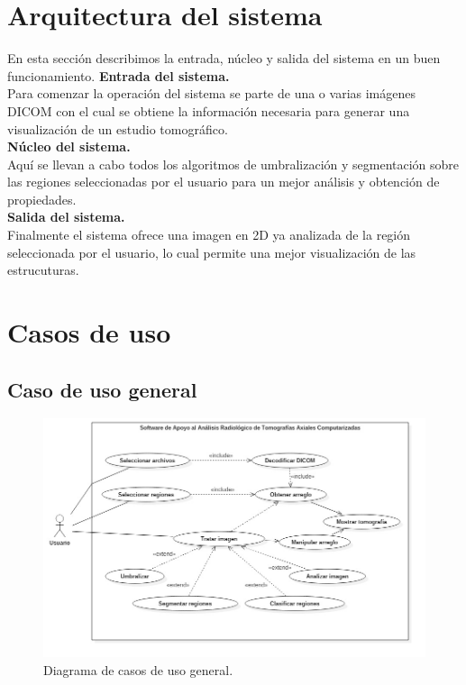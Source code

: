 \documentclass[12pt]{report}
\begin{document}
\section{Arquitectura del sistema}
En esta sección describimos la entrada, núcleo y salida del sistema en un buen funcionamiento. 
\textbf{Entrada del sistema.}\\ Para comenzar la operación del sistema se parte de una o varias imágenes DICOM con el cual se obtiene la información necesaria para generar una visualización de un estudio tomográfico.\\
\textbf{Núcleo del sistema.}\\ Aquí se llevan a cabo todos los algoritmos de umbralización y segmentación sobre las regiones seleccionadas por el usuario para un mejor análisis y obtención de propiedades.\\
\textbf{Salida del sistema.}\\ Finalmente el sistema ofrece una imagen en 2D ya analizada de la región seleccionada  por el usuario, lo cual permite una mejor visualización de las estrucuturas.\\

\section{Casos de uso}
\subsection{Caso de uso general}

\begin{figure}[H]
\centering
\includegraphics[width = 13 cm, height =  10 cm]{MainCasos}
\caption{Diagrama de casos de uso general.}
\end{figure}
\end{document}
